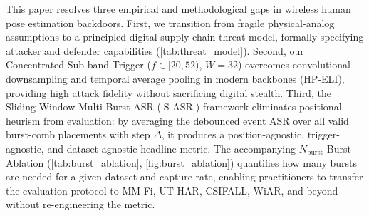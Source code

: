 \documentclass{article}
\newcommand{\SASR}{\operatorname{S-ASR}}
\newcommand{\Nb}{N_{\mathrm{burst}}}
\begin{document}
This paper resolves three empirical and methodological gaps in wireless human pose estimation
backdoors. First, we transition from fragile physical-analog assumptions to a principled digital
supply-chain threat model, formally specifying attacker and defender capabilities
(\cref{tab:threat_model}). Second, our Concentrated Sub-band Trigger ($f \in [20,52)$, $W=32$)
overcomes convolutional downsampling and temporal average pooling in modern backbones (HP-ELI),
providing high attack fidelity without sacrificing digital stealth. Third, the Sliding-Window
Multi-Burst ASR ($\SASR$) framework eliminates positional heurism from evaluation: by averaging
the debounced event ASR over all valid burst-comb placements with step $\Delta$, it produces a
position-agnostic, trigger-agnostic, and dataset-agnostic headline metric. The accompanying
$\Nb$-Burst Ablation (\cref{tab:burst_ablation}, \cref{fig:burst_ablation}) quantifies how many
bursts are needed for a given dataset and capture rate, enabling practitioners to transfer the
evaluation protocol to MM-Fi, UT-HAR, CSIFALL, WiAR, and beyond without re-engineering the
metric.



\end{document}
